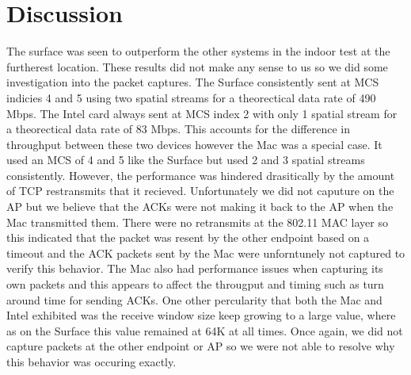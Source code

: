 \section{Discussion}

The surface was seen to outperform the other systems in the indoor test at the furtherest location. These results did not make any sense to us so we did some investigation into the packet captures. The Surface consistently sent at MCS indicies 4 and 5 using two spatial streams for a theorectical data rate of 490 Mbps. The Intel card always sent at MCS index 2 with only 1 spatial stream for a theorectical data rate of 83 Mbps. This accounts for the difference in throughput between these two devices however the Mac was a special case. It used an MCS of 4 and 5 like the Surface but used 2 and 3 spatial streams consistently. However, the performance was hindered drasitically by the amount of TCP restransmits that it recieved. Unfortunately we did not caputure on the AP but we believe that the ACKs were not making it back to the AP when the Mac transmitted them. There were no retransmits at the 802.11 MAC layer so this indicated that the packet was resent by the other endpoint based on a timeout and the ACK packets sent by the Mac were unforntunely not captured to verify this behavior. The Mac also had performance issues when capturing its own packets and this appears to affect the througput and timing such as turn around time for sending ACKs. One other percularity that both the Mac and Intel exhibited was the receive window size keep growing to a large value, where as on the Surface this value remained at 64K at all times. Once again, we did not capture packets at the other endpoint or AP so we were not able to resolve why this behavior was occuring exactly. 
